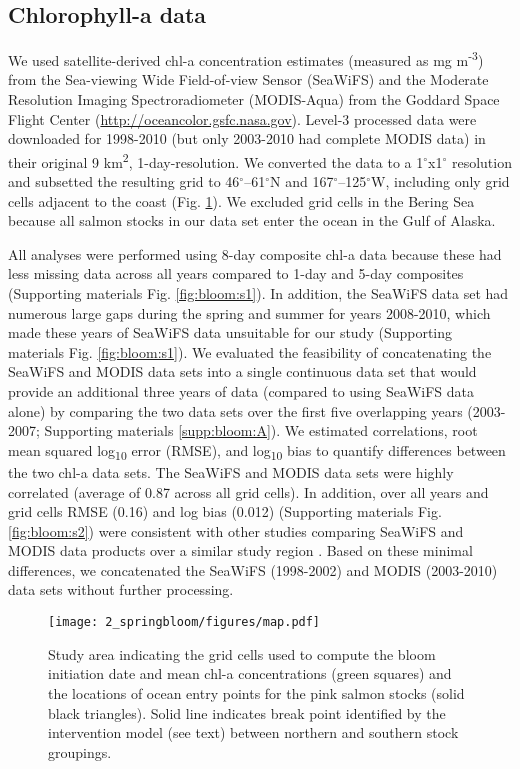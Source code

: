 \subsection{Chlorophyll-a data}

We used satellite-derived chl-a concentration estimates (measured as mg
m\textsuperscript{-3}) from the Sea-viewing Wide Field-of-view Sensor (SeaWiFS)
and the Moderate Resolution Imaging Spectroradiometer (MODIS-Aqua) from the
Goddard Space Flight Center (\url{http://oceancolor.gsfc.nasa.gov}). Level-3
processed data were downloaded for 1998-2010 (but only 2003-2010 had complete
MODIS data) in their original 9 km\textsuperscript{2}, 1-day-resolution. We
converted the data to a 1$^{\circ}$x1$^{\circ}$ resolution and subsetted the
resulting grid to 46$^{\circ}$--61$^{\circ}$N and 167$^{\circ}$--125$^{\circ}$W,
including only grid cells adjacent to the coast (Fig. \ref{fig:bloom:1}). We
excluded grid cells in the Bering Sea because all salmon stocks in our data set
enter the ocean in the Gulf of Alaska.

All analyses were performed using 8-day composite chl-a data because these had
less missing data across all years compared to 1-day and 5-day composites
(Supporting materials Fig. \ref{fig:bloom:s1}). In addition, the SeaWiFS data
set had numerous large gaps during the spring and summer for years 2008-2010,
which made these years of SeaWiFS data unsuitable for our study (Supporting
materials Fig. \ref{fig:bloom:s1}). We evaluated the feasibility of
concatenating the SeaWiFS and MODIS data sets into a single continuous data set
that would provide an additional three years of data (compared to using SeaWiFS
data alone) by comparing the two data sets over the first five overlapping years
(2003-2007; Supporting materials \ref{supp:bloom:A}). We estimated correlations,
root mean squared log\textsubscript{10} error (RMSE), and log\textsubscript{10}
bias to quantify differences between the two chl-a data sets. The SeaWiFS and
MODIS data sets were highly correlated (average of 0.87 across all grid cells).
In addition, over all years and grid cells RMSE (0.16) and log bias (0.012)
(Supporting materials Fig. \ref{fig:bloom:s2}) were consistent with other
studies comparing SeaWiFS and MODIS data products over a similar study region
\citep{Waite2013}. Based on these minimal differences, we concatenated the
SeaWiFS (1998-2002) and MODIS (2003-2010) data sets without further processing.

\begin{figure}[htbp]
  \centering \texttt{[image: 2\_springbloom/figures/map.pdf]}
  \caption[Study area indicating chl-a grid cells and ocean entry locations for
           pink salmon stocks.]{Study area indicating the grid cells used to
           compute the bloom initiation date and mean chl-a concentrations
           (green squares) and the locations of ocean entry points for the pink
           salmon stocks (solid black triangles). Solid line indicates break
           point identified by the intervention model (see text) between
           northern and southern stock groupings.}
  \label{fig:bloom:1}
\end{figure}

